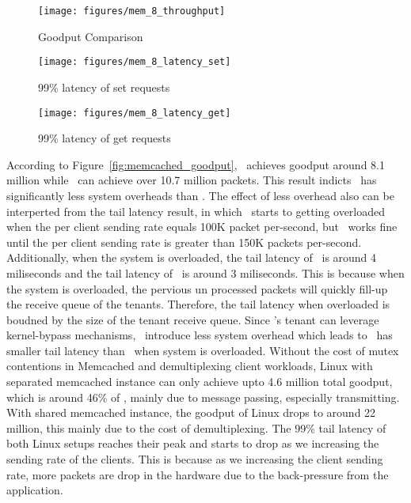 \begin{figure*}[t]
    \centering
    \begin{minipage}[b]{0.32\textwidth}
        \texttt{[image: figures/mem\_8\_throughput]}
        \caption{Goodput Comparison}
	\label{fig:memcached_goodput}
    \end{minipage}
    \begin{minipage}[b]{0.32\textwidth}
        \texttt{[image: figures/mem\_8\_latency\_set]}
        \caption{99\% latency of set requests}
	\label{fig:memcached_latency_set}
    \end{minipage}
    \begin{minipage}[b]{0.32\textwidth}
        \texttt{[image: figures/mem\_8\_latency\_get]}
        \caption{99\% latency of get requests}
	\label{fig:memcached_latency_get}
    \end{minipage}
\end{figure*}

According to Figure~\ref{fig:memcached_goodput}, \cos\ achieves goodput around 8.1 million while \name\ can achieve over 10.7 million packets.
This result indicts \name\ has significantly less system overheads than \cos .
The effect of less overhead also can be interperted from the tail latency result, in which \cos\ starts to getting overloaded when the per client sending rate equals 100K packet per-second, but \name\ works fine until the per client sending rate is greater than 150K packets per-second.
Additionally, when the system is overloaded, the tail latency of \cos\ is around 4 miliseconds and the tail latency of \name\ is around 3 miliseconds.
This is because when the system is overloaded, the pervious un processed packets will quickly fill-up the receive queue of the tenants.
Therefore, the tail latency when overloaded is boudned by the size of the tenant receive queue.
Since \name 's tenant can leverage kernel-bypass mechanisms, \name\ introduce less system overhead which leads to \name\ has smaller tail latency than \cos\ when system is overloaded.
Without the cost of mutex contentions in Memcached and demultiplexing client workloads, Linux with separated memcached instance can only achieve upto 4.6 million total goodput, which is around 46\% of \name , mainly due to message passing, especially transmitting. 
With shared memcached instance, the goodput of Linux drops to around 22 million, this mainly due to the cost of demultiplexing.
The 99\% tail latency of both Linux setups reaches their peak and starts to drop as we increasing the sending rate of the clients.
This is because as we increasing the client sending rate, more packets are drop in the hardware due to the back-pressure from the application. 

